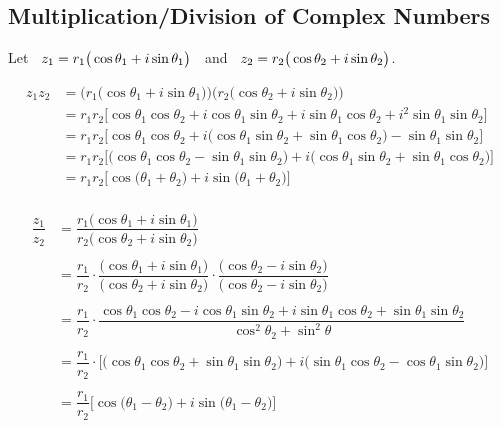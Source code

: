 \documentclass[11pt,a4paper]{article}
\begin{document}
\subsection{Multiplication/Division of Complex Numbers}



Let $\hspace{0.2cm} z_1 = r_1\big(\cos \theta_1 + i \sin \theta_1\big)\hspace{0.2cm}$ and $\hspace{0.2cm} z_2 = r_2\big(\cos \theta_2 + i \sin \theta_2\big)$.

\begin{align*}
z_1z_2 & = \Big(r_1\big(\cos \theta_1 + i \sin \theta_1\big)\Big)\Big(r_2\big(\cos \theta_2 + i \sin \theta_2\big)\Big)\\
& = r_1r_2\big[\cos \theta_1\cos \theta_2 + i\cos \theta_1\sin\theta_2 + i\sin\theta_1\cos\theta_2 + i^2 \sin \theta_1\sin\theta_2\big]\\
& = r_1r_2\big[\cos \theta_1\cos \theta_2 + i\big(\cos \theta_1\sin\theta_2 + \sin\theta_1\cos\theta_2\big) - \sin \theta_1\sin\theta_2\big]\\
& = r_1r_2\big[\big(\cos \theta_1\cos \theta_2  - \sin \theta_1\sin\theta_2\big) + i\big(\cos \theta_1\sin\theta_2 + \sin\theta_1\cos\theta_2\big)\big]\\
& = r_1r_2\big[\cos \big(\theta_1 + \theta_2\big) + i\sin\big(\theta_1 + \theta_2\big)\big]\\
\end{align*}



\begin{align*}
\dfrac{z_1}{z_2} & = \dfrac{r_1\big(\cos \theta_1 + i\sin \theta_1\big)}{r_2\big( \cos \theta_2 + i\sin \theta_2\big)}\\\\
& = \dfrac{r_1}{r_2}\cdot \dfrac{\big(\cos \theta_1 + i\sin \theta_1\big)}{\big( \cos \theta_2 + i\sin \theta_2\big)}\cdot \dfrac{\big( \cos \theta_2 - i\sin \theta_2\big)}{\big( \cos \theta_2 - i\sin \theta_2\big)}\\\\
& = \dfrac{r_1}{r_2}\cdot \dfrac{\cos \theta_1\cos \theta_2 - i\cos \theta_1\sin\theta_2 + i\sin\theta_1\cos\theta_2 + \sin\theta_1\sin\theta_2}{\cos^2\theta_2 + \sin^2\theta}\\\\
& = \dfrac{r_1}{r_2}\cdot \big[\big(\cos \theta_1\cos \theta_2 + \sin\theta_1\sin\theta_2\big) + i\big(\sin\theta_1\cos\theta_2 - \cos \theta_1\sin\theta_2\big)\big]\\\\
& = \dfrac{r_1}{r_2}\big[\cos \big(\theta_1-\theta_2\big) + i\sin \big(\theta_1-\theta_2\big)\big]\\\\
\end{align*}
\end{document}

